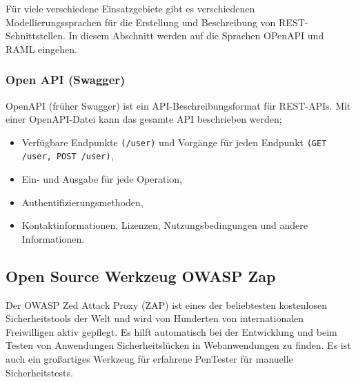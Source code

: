 Für viele verschiedene Einsatzgebiete gibt es verschiedenen Modellierungssprachen für die Erstellung und Beschreibung von REST-Schnittstellen. In diesem Abschnitt werden auf die Sprachen OPenAPI und RAML eingehen.

\subsubsection{Open API (Swagger)}



OpenAPI (früher Swagger) ist ein API-Beschreibungsformat für REST-APIs. Mit einer OpenAPI-Datei kann das gesamte API beschrieben werden\cite{openapi13def};

\begin{itemize}
	
	\item Verfügbare Endpunkte \texttt{(/user)} und Vorgänge für jeden Endpunkt \texttt{(GET /user, POST /user)},
	
	\item Ein- und Ausgabe für jede Operation,
	
	\item Authentifizierungsmethoden,
	
	\item Kontaktinformationen, Lizenzen, Nutzungsbedingungen und andere Informationen.
	
\end{itemize}

\subsection{Open Source Werkzeug OWASP Zap}

Der OWASP Zed Attack Proxy (ZAP) ist eines der beliebtesten kostenlosen Sicherheitstools der Welt und wird von Hunderten von internationalen Freiwilligen aktiv gepflegt. Es hilft automatisch bei der Entwicklung und beim Testen von Anwendungen Sicherheitslücken in Webanwendungen zu finden. Es ist auch ein großartiges Werkzeug für erfahrene PenTester für manuelle Sicherheitstests\cite{owasp18def}.

